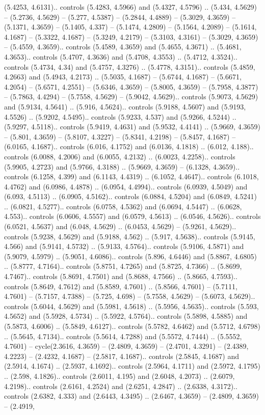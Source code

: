 (5.4253, 4.6131).. controls (5.4283, 4.5966) and (5.4327, 4.5796) .. (5.434, 4.5629) -- (5.2736, 4.5629) -- (5.277, 4.5387) -- (5.2844, 4.4889) -- (5.3029, 4.3659) -- (5.1371, 4.3659) -- (5.1405, 4.337) -- (5.1474, 4.2809) -- (5.1564, 4.2089) -- (5.1614, 4.1687) -- (5.3322, 4.1687) -- (5.3249, 4.2179) -- (5.3103, 4.3161) -- (5.3029, 4.3659) -- (5.4559, 4.3659).. controls (5.4589, 4.3659) and (5.4655, 4.3671) .. (5.4681, 4.3653).. controls (5.4707, 4.3636) and (5.4708, 4.3553) .. (5.4712, 4.3524).. controls (5.4734, 4.34) and (5.4757, 4.3276) .. (5.4778, 4.3151).. controls (5.4859, 4.2663) and (5.4943, 4.2173) .. (5.5035, 4.1687) -- (5.6744, 4.1687) -- (5.6671, 4.2054) -- (5.6571, 4.2551) -- (5.6346, 4.3659) -- (5.8005, 4.3659) -- (5.7958, 4.3877) -- (5.7863, 4.4294) -- (5.7558, 4.5629) -- (5.9042, 4.5629).. controls (5.9073, 4.5629) and (5.9134, 4.5641) .. (5.916, 4.5624).. controls (5.9188, 4.5607) and (5.9193, 4.5526) .. (5.9202, 4.5495).. controls (5.9233, 4.537) and (5.9266, 4.5244) .. (5.9297, 4.5118).. controls (5.9419, 4.4631) and (5.9532, 4.4141) .. (5.9669, 4.3659) -- (5.801, 4.3659) -- (5.8107, 4.3227) -- (5.8341, 4.2198) -- (5.8457, 4.1687) -- (6.0165, 4.1687).. controls (6.016, 4.1752) and (6.0136, 4.1818) .. (6.012, 4.188).. controls (6.0088, 4.2006) and (6.0055, 4.2132) .. (6.0023, 4.2258).. controls (5.9905, 4.2723) and (5.9766, 4.3188) .. (5.9669, 4.3659) -- (6.1328, 4.3659).. controls (6.1258, 4.399) and (6.1143, 4.4319) .. (6.1052, 4.4647).. controls (6.1018, 4.4762) and (6.0986, 4.4878) .. (6.0954, 4.4994).. controls (6.0939, 4.5049) and (6.093, 4.5113) .. (6.0905, 4.5162).. controls (6.0884, 4.5204) and (6.0849, 4.5241) .. (6.0821, 4.5277).. controls (6.0758, 4.5362) and (6.0694, 4.5447) .. (6.0628, 4.553).. controls (6.0606, 4.5557) and (6.0579, 4.5613) .. (6.0546, 4.5626).. controls (6.0521, 4.5637) and (6.048, 4.5629) .. (6.0453, 4.5629) -- (5.9261, 4.5629).. controls (5.9238, 4.5629) and (5.9188, 4.562) .. (5.917, 4.5638).. controls (5.9145, 4.566) and (5.9141, 4.5732) .. (5.9133, 4.5764).. controls (5.9106, 4.5871) and (5.9079, 4.5979) .. (5.9051, 4.6086).. controls (5.896, 4.6446) and (5.8867, 4.6805) .. (5.8777, 4.7164).. controls (5.8751, 4.7265) and (5.8725, 4.7366) .. (5.8699, 4.7467).. controls (5.8691, 4.7501) and (5.8688, 4.7566) .. (5.8665, 4.7593).. controls (5.8649, 4.7612) and (5.8589, 4.7601) .. (5.8566, 4.7601) -- (5.7111, 4.7601) -- (5.7157, 4.7388) -- (5.725, 4.698) -- (5.7558, 4.5629) -- (5.6073, 4.5629).. controls (5.6044, 4.5629) and (5.5981, 4.5618) .. (5.5956, 4.5635).. controls (5.593, 4.5652) and (5.5928, 4.5734) .. (5.5922, 4.5764).. controls (5.5898, 4.5885) and (5.5873, 4.6006) .. (5.5849, 4.6127).. controls (5.5782, 4.6462) and (5.5712, 4.6798) .. (5.5645, 4.7134).. controls (5.5614, 4.7288) and (5.5572, 4.7444) .. (5.5552, 4.7601) -- cycle(2.3616, 4.3659) -- (2.4809, 4.3659) -- (2.4701, 4.3291) -- (2.4389, 4.2223) -- (2.4232, 4.1687) -- (2.5817, 4.1687).. controls (2.5845, 4.1687) and (2.5914, 4.1674) .. (2.5937, 4.1692).. controls (2.5964, 4.1711) and (2.5972, 4.1795) .. (2.598, 4.1826).. controls (2.6011, 4.195) and (2.6048, 4.2073) .. (2.6079, 4.2198).. controls (2.6161, 4.2524) and (2.6251, 4.2847) .. (2.6338, 4.3172).. controls (2.6382, 4.333) and (2.6443, 4.3495) .. (2.6467, 4.3659) -- (2.4809, 4.3659) -- (2.4919, 